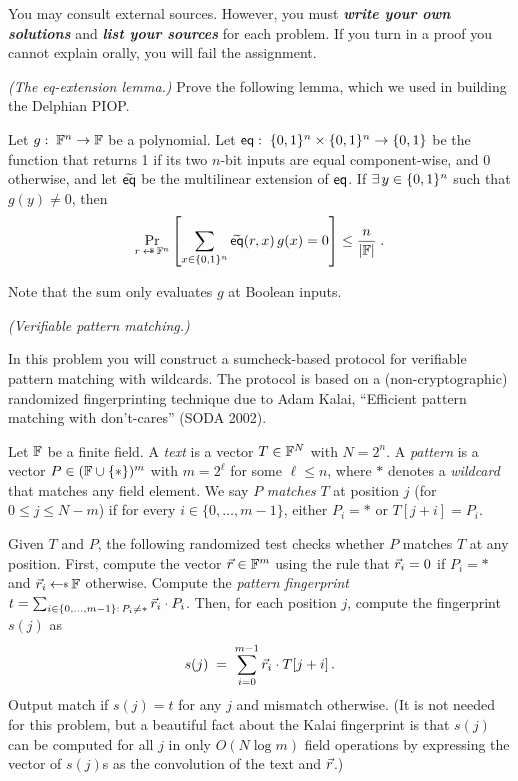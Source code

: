 \medskip
\noindent You may consult external sources.  However, you must \textbf{\emph{write your own solutions}} and \textbf{\emph{list your sources}} for each problem. If you turn in a proof you cannot explain orally, you will fail the assignment.



\begin{questions}
	\question \emph{(The eq-extension lemma.)} Prove the following lemma, which we used in building the Delphian PIOP.
	\begin{lemma*}
		Let $g:\; \mathbb{F}^n \to \mathbb{F}$ be a polynomial.  Let $\mathsf{eq} :\; \{0,1\}^n\times\{0,1\}^n\to\{0,1\}$ be the function that returns 1 if its two $n$-bit inputs are equal component-wise, and 0 otherwise, and let $\widetilde{\mathsf{eq}}$ be the multilinear extension of $\mathsf{eq}$.  If $\exists\, y \in \{0,1\}^n$ such that $g(y) \neq 0$, then
		$$
			\Pr_{r\getsr\F^n}\left[\sum\limits_{x\in\bits^n} \eqext(r, x)\, g(x) = 0\right] \leq \frac{n}{|\F|}\; .
		$$
	\end{lemma*}

	Note that the sum only evaluates $g$ at Boolean inputs.

	\begin{solution}

	\end{solution}
	\question \emph{(Verifiable pattern matching.)}

	In this problem you will construct a sumcheck-based protocol for verifiable pattern matching with wildcards. The protocol is based on a (non-cryptographic) randomized fingerprinting technique due to Adam Kalai, ``Efficient pattern matching with don't-cares'' (SODA 2002).

	 Let $\mathbb{F}$ be a finite field.  A \emph{text} is a vector $T \in \mathbb{F}^N$ with $N = 2^n$.  A \emph{pattern} is a vector $P \in (\mathbb{F} \cup \{*\})^m$ with $m = 2^\ell$ for some $\ell \leq n$, where $*$ denotes a \emph{wildcard} that matches any field element.  We say $P$ \emph{matches} $T$ at position $j$ (for $0 \leq j \leq N - m$) if for every $i \in \{0, \ldots, m-1\}$, either $P_i = *$ or $T[j+i] = P_i$.


	 Given $T$ and $P$, the following randomized test checks whether $P$ matches $T$ at any position. First, compute the vector $\vec{r}\in\mathbb{F}^m$ using the rule that $\vec{r}_i = 0$ if $P_i = *$ and $\vecr_i \getsr \F$ otherwise.
	Compute the \emph{pattern fingerprint} $t = \sum_{i\in\{0,\ldots,m-1\}:\, P_i \neq *} \vec{r}_i \cdot P_i$. Then, for each position $j$, compute the fingerprint $s(j)$ as
	$$
		s(j) \;=\; \sum_{i=0}^{m-1} \vec{r}_i \cdot T[j+i]\,.
	$$
	Output \textsf{match} if $s(j) = t$ for any $j$ and \textsf{mismatch} otherwise. (It is not needed for this problem, but a beautiful fact about the Kalai fingerprint is that $s(j)$ can be computed for all $j$ in only $O(N\log m)$ field operations by expressing the vector of $s(j)$s as the convolution of the text and $\vec{r}$.)


\end{questions}
